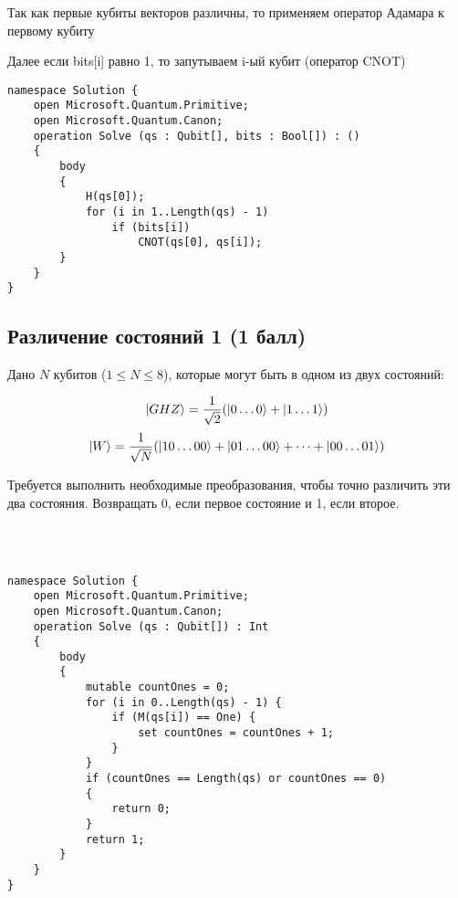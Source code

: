 \documentclass[a4paper,12pt]{article}
\begin{document}
Так как первые кубиты векторов различны, то применяем оператор Адамара к первому кубиту

Далее если bits[i] равно 1, то запутываем i-ый кубит (оператор CNOT)


\begin{lstlisting}
namespace Solution {
    open Microsoft.Quantum.Primitive;
    open Microsoft.Quantum.Canon;
    operation Solve (qs : Qubit[], bits : Bool[]) : ()
    {
        body
        {
            H(qs[0]);
            for (i in 1..Length(qs) - 1)
                if (bits[i]) 
                    CNOT(qs[0], qs[i]);
        }
    }
}
\end{lstlisting}







\subsection{Различение состояний 1 (1 балл)}

Дано $N$ кубитов ($1 \le N \le 8$), которые могут быть в одном из двух состояний:

$$\Ket{GHZ} = \frac{1}{\sqrt2}(\Ket{0\dots0} +\Ket{1\dots1})$$
$$\Ket{W} = \frac{1}{\sqrt N}(\Ket{10\dots00}+\Ket{01\dots00} + \dots +\Ket{00\dots01})$$

Требуется выполнить необходимые преобразования, чтобы точно различить эти два состояния. Возвращать $0$, если первое состояние и 1, если второе. 

\\\\
\begin{lstlisting}
namespace Solution {
    open Microsoft.Quantum.Primitive;
    open Microsoft.Quantum.Canon;
    operation Solve (qs : Qubit[]) : Int
    {
        body
        {
            mutable countOnes = 0;
            for (i in 0..Length(qs) - 1) {
                if (M(qs[i]) == One) {
                    set countOnes = countOnes + 1;
                }
            }
            if (countOnes == Length(qs) or countOnes == 0)
            {
                return 0;
            }
            return 1;
        }
    }
}


\end{lstlisting}
\end{document}
